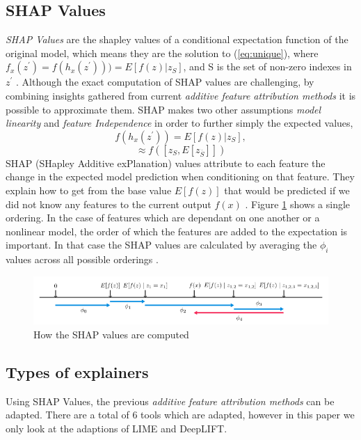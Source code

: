 \subsection{SHAP Values}
\emph{SHAP Values} are the shapley values of a conditional expectation function of the original model, which means they are the solution to (\ref{eq:unique}), where $f_{x}(z^{'}) = f(h_{x}(z^{'}))) = E[f(z) | z_{S}]$, and S is the set of non-zero indexes in $z^{'}$ \cite{NIPS2017_7062}. Although the exact computation of SHAP values are challenging, by combining insights gathered from current \emph{additive feature attribution methods} it is possible to approximate them.
SHAP makes two other assumptions  \emph{model linearity} and \emph{feature Independence} in order to further simply the expected values,
\begin{equation*}
f(h_{x}(z^{'})) = E[f(z) | z_{S}],
\end{equation*}
\begin{equation}
\approx f([z_{S}, E[z_{\overline{S}}]])
\label{eq:summarized-unique}
\end{equation}
SHAP (SHapley Additive exPlanation) values attribute to each feature the change in the expected model prediction when conditioning on that feature.  They explain how to get from the base value $E[f(z)]$ that would be predicted if we did not know any features to the current output $f(x)$ \cite{NIPS2017_7062}. Figure \ref{fig:shap-values} shows a single ordering. In the case of features which are dependant on one another or a nonlinear model, the order of which the features are added to the expectation is important.  In that case the SHAP values are calculated by averaging the $\phi_{i}$ values across all possible orderings \cite{NIPS2017_7062}. 
\begin  {figure} [!htbp]
  \includegraphics[width=\linewidth]{Evaluation_Images/Shap_values.png}
  \caption{How the SHAP values are computed\cite{NIPS2017_7062}}
  \label{fig:shap-values}
\end{figure}

\subsection{Types of explainers}
Using SHAP Values, the previous \emph{additive feature attribution methods} can be adapted. There are a total of 6 tools which are adapted, however in this paper we only look at the adaptions of LIME and DeepLIFT\cite{DBLP:journals/corr/ShrikumarGK17}\cite{DBLP:journals/corr/ShrikumarGSK16}.

